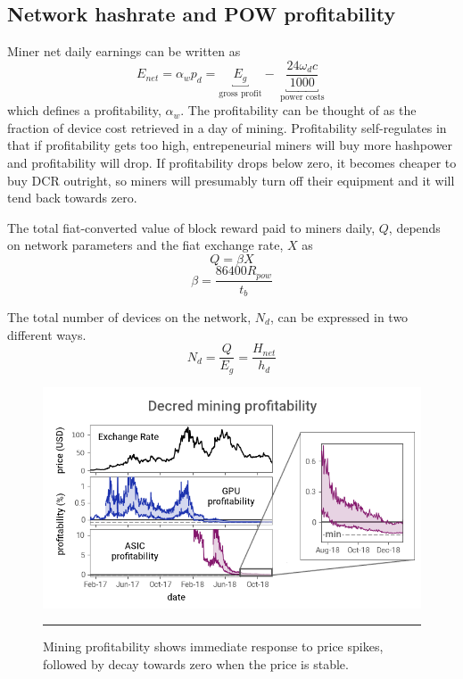 \documentclass[a4paper,12pt]{article}
\begin{document}
% 


\begin{appendices}
\section{Network hashrate and POW profitability}



Miner net daily earnings can be written as 
%
\begin{equation}
\label{enet}
E_{net} = \alpha_w p_d = \underbracket{ E_g }_{\text{gross profit}} -  \underbracket{ \frac{ 24 \omega_d c }{ 1000 } }_{ \text{ power costs } } 
\end{equation}
%
which defines a profitability, $ \alpha_w $. The profitability can be thought of as the fraction of device cost retrieved in a day of mining. Profitability self-regulates in that if profitability gets too high, entrepeneurial miners will buy more hashpower and profitability will drop. If profitability drops below zero, it becomes cheaper to buy DCR outright, so miners will presumably turn off their equipment and it will tend back towards zero. 

The total fiat-converted value of block reward paid to miners daily, $ Q $, depends on network parameters and the fiat exchange rate, $ X $ as
%
\begin{equation}
Q = \beta X 
\end{equation}
\begin{equation}
\beta = \frac{ 86400 R_{pow} }{ t_b }
\end{equation}
%

The total number of devices on the network, $ N_d $, can be expressed in two different ways. 
%
\begin{equation}
N_d = \frac{ Q }{ E_{g} } = \frac{ H_{ net } }{ h_d }
\end{equation}
%
\begin{figure}[t!]
	\centering
	\includegraphics[width=5.77in]{profitability}
	\caption{Mining profitability shows immediate response to price spikes, followed by decay towards zero when the price is stable. \label{profitabilityfig}}
	\vspace{5pt}
	\hrule
\end{figure}


\end{appendices}
\end{document}

